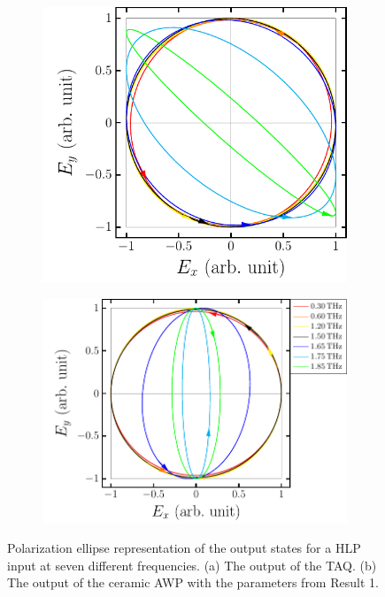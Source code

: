 \begin{figure}[H]
    \begin{subfigure}[b]{.5\linewidth}
    \caption{}\label{}
    \centering\includegraphics[scale=0.7]{images/results/plots/ceramic/pe_cl4_lp_a.pdf}
    \end{subfigure}%
    \begin{subfigure}[b]{.5\linewidth}
    \caption{}\label{}
    \centering\includegraphics[scale=0.7]{images/results/plots/ceramic/pe_cl4_lp_b.pdf}
    \end{subfigure}
    \caption{Polarization ellipse representation of the output states for a HLP input at seven different frequencies. (a) The output of the TAQ. (b) The output of the ceramic AWP with the parameters from Result 1.}
    \label{fig:cl4_pe_lp}
\end{figure}

